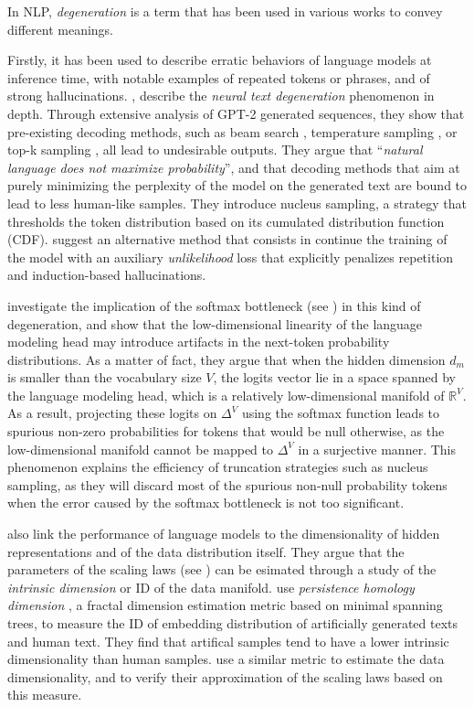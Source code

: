 In NLP, \textit{degeneration} is a term that has been used in various works to convey different meanings. 

Firstly, it has been used to describe erratic behaviors of language models at inference time, with notable examples of repeated tokens or phrases, and of strong hallucinations. \citet{Holtzman2020The}, describe the \textit{neural text degeneration} phenomenon in depth. Through extensive analysis of GPT-2 generated sequences, they show that pre-existing decoding methods, such as beam search \citep{freitag-al-onaizan-2017-beam}, temperature sampling \citep{ACKLEY1985147}, or top-k sampling \citep{gpt2}, all lead to undesirable outputs. They argue that ``\textit{natural language does not maximize probability}'', and that decoding methods that aim at purely minimizing the perplexity of the model on the generated text are bound to lead to less human-like samples. They introduce nucleus sampling, a strategy that thresholds the token distribution based on its cumulated distribution function (CDF). \citet{Welleck2020Neural} suggest an alternative method that consists in continue the training of the model with an auxiliary \textit{unlikelihood} loss that explicitly penalizes repetition and induction-based hallucinations.

\citet{finlayson2024closing} investigate the implication of the softmax bottleneck (see ) in this kind of degeneration, and show that the low-dimensional linearity of the language modeling head may introduce artifacts in the next-token probability distributions. As a matter of fact, they argue that when the hidden dimension $d_m$ is smaller than the vocabulary size $V$, the logits vector lie in a space spanned by the language modeling head, which is a relatively low-dimensional manifold of $\mathbb{R}^V$. As a result, projecting these logits on $\Delta^V$ using the softmax function leads to spurious non-zero probabilities for tokens that would be null otherwise, as the low-dimensional manifold cannot be mapped to $\Delta^V$ in a surjective manner. This phenomenon explains the efficiency of truncation strategies such as nucleus sampling, as they will discard most of the spurious non-null probability tokens when the error caused by the softmax bottleneck is not too significant.

\citet{scaling_manifold} also link the performance of language models to the dimensionality of hidden representations and of the data distribution itself. They argue that the parameters of the scaling laws (see ) can be esimated through a study of the \textit{intrinsic dimension} or ID \citep{intrinsic_d} of the data manifold. \citet{intrinsic_d} use \textit{persistence homology dimension} \citep{phdim}, a fractal dimension estimation metric based on minimal spanning trees, to measure the ID of embedding distribution of artificially generated texts and human text. They find that artifical samples tend to have a lower intrinsic dimensionality than human samples. \citet{scaling_manifold} use a similar metric to estimate the data dimensionality, and to verify their approximation of the scaling laws based on this measure.



